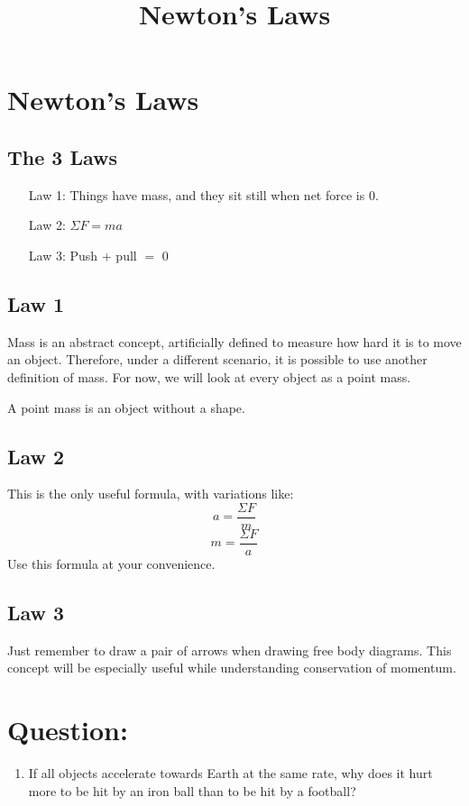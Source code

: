 \documentclass[]{article}
\title{Newton's Laws}
\author{}
\begin{document}
\maketitle

\section{Newton's Laws}
	\subsection{The 3 Laws}
	\begin{enumerate}
		\item[Law 1:] Things have mass, and they sit still when net force is 0. 
		\item[Law 2:] $\Sigma F=ma$
		\item[Law 3:] Push $+$ pull $=$ $0$
	\end{enumerate}
	\subsection{Law 1}
		Mass is an abstract concept, artificially defined to measure how hard it is to move an object. Therefore, under a different scenario, it is possible to use another definition of mass. For now, we will look at every object as a point mass.
		
		A point mass is an object without a shape.
	\subsection{Law 2}
		This is the only useful formula, with variations like:
		$$a= \frac{\Sigma F}{m}$$
		$$m = \frac{\Sigma F} {a}$$
		Use this formula at your convenience.
	\subsection{Law 3}
		Just remember to draw a pair of arrows when drawing free body diagrams. This concept will be especially useful while understanding conservation of momentum.
	
	\section{Question:}
	\begin{enumerate}
		\item If all objects accelerate towards Earth at the same rate, why does it hurt more to be hit by an iron ball than to be hit by a football?
	\end{enumerate}
\end{document}
